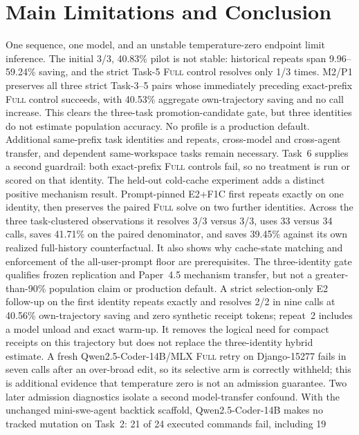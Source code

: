 \documentclass[11pt]{article}
\begin{document}
\section{Main Limitations and Conclusion}

One sequence, one model, and an unstable temperature-zero endpoint limit
inference.  The initial 3/3, 40.83\% pilot is not stable: historical repeats
span 9.96--59.24\% saving, and the strict Task-5 \textsc{Full} control resolves
only 1/3 times.  M2/P1 preserves all three strict Task-3--5 pairs whose
immediately preceding exact-prefix \textsc{Full} control succeeds, with 40.53\%
aggregate own-trajectory saving and no call increase.  This clears the
three-task promotion-candidate gate, but three identities do not estimate
population accuracy.  No profile is a production default.  Additional
same-prefix task identities and repeats, cross-model and cross-agent transfer,
and dependent same-workspace tasks remain necessary.  Task~6 supplies a second
guardrail: both exact-prefix \textsc{Full} controls fail, so no treatment is run
or scored on that identity.
The held-out cold-cache experiment adds a distinct positive mechanism result.
Prompt-pinned E2+F1C first repeats exactly on one identity, then preserves the
paired \textsc{Full} solve on two further identities.  Across the three
task-clustered observations it resolves 3/3 versus 3/3, uses 33 versus 34
calls, saves 41.71\% on the paired denominator, and saves 39.45\% against its
own realized full-history counterfactual.  It also shows why cache-state
matching and enforcement of the all-user-prompt floor are prerequisites.  The
three-identity gate qualifies frozen replication and Paper~4.5 mechanism
transfer, but not a greater-than-90\% population claim or production default.
A strict selection-only E2 follow-up on the first identity repeats exactly and
resolves 2/2 in nine calls at 40.56\% own-trajectory saving and zero synthetic
receipt tokens; repeat~2 includes a model unload and exact warm-up.  It removes
the logical need for compact receipts on this trajectory but does not replace
the three-identity hybrid estimate.  A fresh
Qwen2.5-Coder-14B/MLX \textsc{Full} retry on Django-15277 fails in seven calls
after an over-broad edit, so its selective arm is correctly withheld; this is
additional evidence that temperature zero is not an admission guarantee.
Two later admission diagnostics isolate a second model-transfer confound.
With the unchanged mini-swe-agent backtick scaffold, Qwen2.5-Coder-14B makes
no tracked mutation on Task~2: 21 of 24 executed commands fail, including 19
\end{document}
